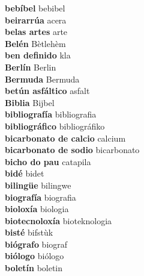 \textbf{ bebíbel  } bebibel \\
\textbf{ beirarrúa  } acera \\
\textbf{ belas artes  } arte \\
\textbf{ Belén  } Bètlehèm \\
\textbf{ ben definido  } kla \\
\textbf{ Berlín  } Berlin \\
\textbf{ Bermuda  } Bermuda \\
\textbf{ betún asfáltico  } asfalt \\
\textbf{ Biblia  } Bijbel \\
\textbf{ bibliografía  } bibliografia \\
\textbf{ bibliográfico  } bibliográfiko \\
\textbf{ bicarbonato de calcio  } calcium \\
\textbf{ bicarbonato de sodio  } bicarbonato \\
\textbf{ bicho do pau  } catapila \\
\textbf{ bidé  } bidet \\
\textbf{ bilingüe  } bilingwe \\
\textbf{ biografía  } biografia \\
\textbf{ bioloxía  } biologia \\
\textbf{ biotecnoloxía  } bioteknologia \\
\textbf{ bisté  } bifstùk \\
\textbf{ biógrafo  } biograf \\
\textbf{ biólogo  } biólogo \\
\textbf{ boletín  } boletin \\
